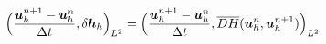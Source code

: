 \documentclass[preview]{standalone}
\newcommand{\bu}{\boldsymbol{u}_h}
\newcommand{\dbh}{\delta\boldsymbol{h}_h}
\begin{document}
\begin{align*}
\special{dvisvgm:raw <g id='unique000'>}\Big(\frac{\bu^{n+1}-\bu^n}{\Delta t},\dbh\Big)_{L^2}=\Big(\frac{\bu^{n+1}-\bu^n}{\Delta t},\overline{DH}(\bu^n,\bu^{n+1})\Big)_{L^2}\special{dvisvgm:raw </g>}
\end{align*}
\end{document}
